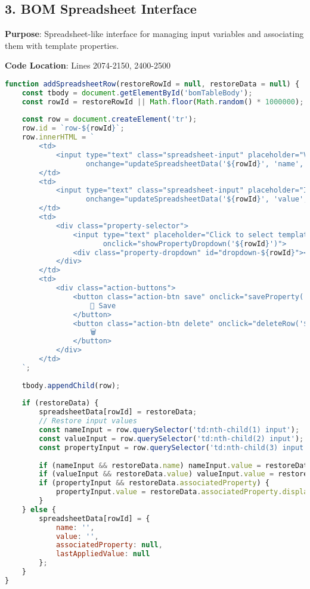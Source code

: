 \documentclass[12pt,a4paper]{article}
\begin{document}
\subsection{3. BOM Spreadsheet Interface}

\textbf{Purpose}: Spreadsheet-like interface for managing input variables and associating them with template properties.

\textbf{Code Location}: Lines 2074-2150, 2400-2500

\begin{lstlisting}[language=JavaScript, caption=Spreadsheet Row Management]
function addSpreadsheetRow(restoreRowId = null, restoreData = null) {
    const tbody = document.getElementById('bomTableBody');
    const rowId = restoreRowId || Math.floor(Math.random() * 1000000);
    
    const row = document.createElement('tr');
    row.id = `row-${rowId}`;
    row.innerHTML = `
        <td>
            <input type="text" class="spreadsheet-input" placeholder="Variable name" 
                   onchange="updateSpreadsheetData('${rowId}', 'name', this.value)">
        </td>
        <td>
            <input type="text" class="spreadsheet-input" placeholder="Input value" 
                   onchange="updateSpreadsheetData('${rowId}', 'value', this.value)">
        </td>
        <td>
            <div class="property-selector">
                <input type="text" placeholder="Click to select template property" readonly
                       onclick="showPropertyDropdown('${rowId}')">
                <div class="property-dropdown" id="dropdown-${rowId}"></div>
            </div>
        </td>
        <td>
            <div class="action-buttons">
                <button class="action-btn save" onclick="saveProperty('${rowId}')">
                    💾 Save
                </button>
                <button class="action-btn delete" onclick="deleteRow('${rowId}')">
                    🗑️
                </button>
            </div>
        </td>
    `;
    
    tbody.appendChild(row);
    
    if (restoreData) {
        spreadsheetData[rowId] = restoreData;
        // Restore input values
        const nameInput = row.querySelector('td:nth-child(1) input');
        const valueInput = row.querySelector('td:nth-child(2) input');
        const propertyInput = row.querySelector('td:nth-child(3) input');
        
        if (nameInput && restoreData.name) nameInput.value = restoreData.name;
        if (valueInput && restoreData.value) valueInput.value = restoreData.value;
        if (propertyInput && restoreData.associatedProperty) {
            propertyInput.value = restoreData.associatedProperty.displayName;
        }
    } else {
        spreadsheetData[rowId] = {
            name: '',
            value: '',
            associatedProperty: null,
            lastAppliedValue: null
        };
    }
}
\end{lstlisting}
\end{document}
